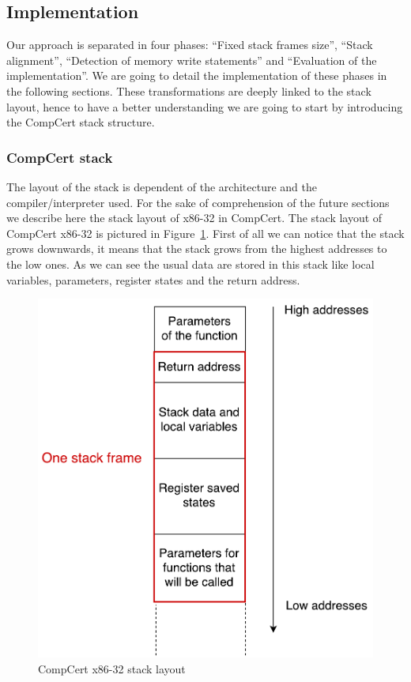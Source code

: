 \documentclass[11pt]{sdm}
\begin{document}
\subsection{Implementation}
\label{sub:Implementation}
	Our approach is separated in four phases: ``Fixed stack frames size'', ``Stack alignment'', ``Detection of memory write statements'' and ``Evaluation of the implementation''. We are going to detail the implementation of these phases in the following sections. These transformations are deeply linked to the stack layout, hence to have a better understanding we are going to start by introducing the CompCert stack structure.

\subsubsection{CompCert stack}
\label{ssub:CompCert stack}
	The layout of the stack is dependent of the architecture and the compiler/interpreter used. For the sake of comprehension of the future sections we describe here the stack layout of x86-32 in CompCert.
The stack layout of CompCert x86-32 is pictured in Figure~\ref{stack_layout}.
First of all we can notice that the stack grows downwards, it means that the stack grows from the highest addresses to the low ones.
As we can see the usual data are stored in this stack like local variables, parameters, register states and the return address.

\begin{figure}[!ht]
\centering
\includegraphics[scale=0.55]{images/stack_layout.pdf}
\caption{CompCert x86-32 stack layout}
\label{stack_layout}
\end{figure}
\end{document}
